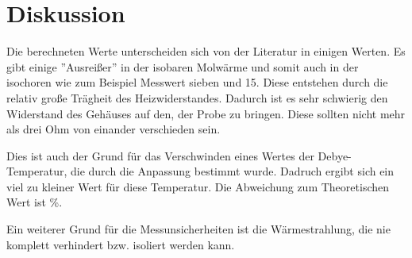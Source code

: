 \section{Diskussion}
Die berechneten Werte unterscheiden sich von der Literatur in einigen Werten. Es gibt einige ''Ausreißer'' in der isobaren Molwärme und somit auch in der isochoren wie zum Beispiel Messwert sieben und 15. Diese entstehen durch die relativ große Trägheit des Heizwiderstandes. Dadurch ist es sehr schwierig den Widerstand des Gehäuses auf den, der Probe zu bringen. Diese sollten nicht mehr als drei Ohm von einander verschieden sein.

\noindent Dies ist auch der Grund für das Verschwinden eines Wertes der Debye-Temperatur, die durch die Anpassung bestimmt wurde. Dadruch ergibt sich ein viel zu kleiner Wert für diese Temperatur. Die Abweichung zum Theoretischen Wert ist \%.

\noindent Ein weiterer Grund für die Messunsicherheiten ist die Wärmestrahlung, die nie komplett verhindert bzw. isoliert werden kann.